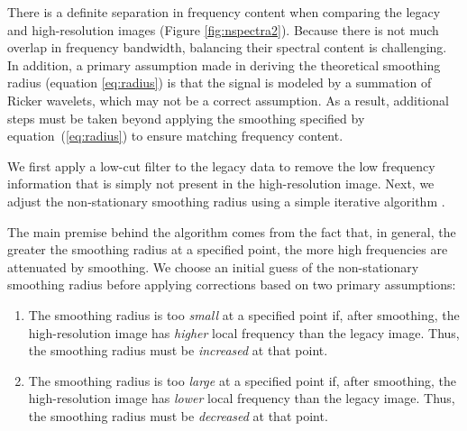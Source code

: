     There is a definite separation in frequency content when comparing the legacy and high-resolution images (Figure \ref{fig:nspectra2}). 
    Because there is not much overlap in frequency bandwidth, balancing their spectral content is challenging. 
    In addition, a primary assumption made in deriving the theoretical smoothing radius (equation \ref{eq:radius}) is that the signal is modeled by a summation of Ricker wavelets, which may not be a correct assumption. 
    As a result, additional steps must be taken beyond applying the smoothing specified by equation~(\ref{eq:radius}) to ensure matching frequency content. 
    
    We first apply a low-cut filter to the legacy data to remove the low frequency information that is simply not present in the high-resolution image. 
    Next, we adjust the non-stationary smoothing radius using a simple iterative algorithm \cite[]{locfreq}. 
    
    The main premise behind the algorithm comes from the fact that, in general, the greater the smoothing radius at a specified point, the more high frequencies are attenuated by smoothing.
    We choose an initial guess of the non-stationary smoothing radius before applying corrections based on two primary assumptions:
    \begin{enumerate}
    \item The smoothing radius is too \emph{small} at a specified point if, after smoothing, the high-resolution image has \emph{higher} local frequency than the legacy image. Thus, the smoothing radius must be \emph{increased} at that point. 
    \item The smoothing radius is too \emph{large} at a specified point if, after smoothing, the high-resolution image has \emph{lower} local frequency than the legacy image. Thus, the smoothing radius must be \emph{decreased} at that point.
    \end{enumerate}
    
